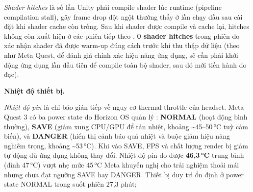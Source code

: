 \textit{Shader hitches} là số lần Unity phải compile shader lúc runtime (pipeline
compilation stall), gây frame drop đột ngột thường thấy ở lần chạy đầu sau cài đặt khi
shader cache còn trống. Sau khi shader được compile và cache lại, hitches không còn xuất
hiện ở các phiên tiếp theo \cite{meta_ovr_best_practices}. \textbf{0 shader hitches} trong
phiên đo xác nhận shader đã được warm-up đúng cách trước khi thu thập dữ liệu (theo như Meta Quest, để đánh giá chính xác hiệu năng ứng dụng, sẽ cần phải khởi động ứng dụng lần đầu tiên để compile toàn bộ shader, sau đó mới tiến hành đo đạc).

\textbf{Nhiệt độ thiết bị.}

\textit{Nhiệt độ pin} là chỉ báo gián tiếp về nguy cơ thermal throttle của headset. Meta
Quest 3 có ba power state do Horizon OS quản lý \cite{meta_ovr_stats}: \textbf{NORMAL} (hoạt
động bình thường), \textbf{SAVE} (giảm xung CPU/GPU để tản nhiệt, khoảng \textasciitilde45--50\,°C
tuỳ cảm biến), và \textbf{DANGER} (hiển thị cảnh báo quá nhiệt và buộc giảm hiệu năng
nghiêm trọng, khoảng \textasciitilde53\,°C). Khi vào SAVE, FPS và chất lượng render bị
giảm tự động dù ứng dụng không thay đổi. Nhiệt độ pin đo được \textbf{46{,}3\,°C} trung
bình (đỉnh 47\,°C) vượt nhẹ mức 45\,°C Meta khuyến nghị cho trải nghiệm thoải mái nhưng
chưa đạt ngưỡng SAVE hay DANGER. Thiết bị duy trì ổn định ở power state NORMAL trong suốt
phiên 27{,}3 phút;



